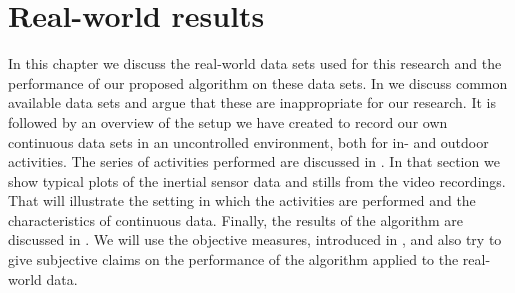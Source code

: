 
\chapter{Real-world results}

\label{Chapter6} %


In this chapter we discuss the real-world data sets used for this research and the performance of our proposed algorithm on these data sets.
In  we discuss common available data sets and argue that these are inappropriate for our research.
It is followed by an overview of the setup we have created to record our own continuous data sets in an uncontrolled environment, both for in- and outdoor activities.
The series of activities performed are discussed in .
In that section we show typical plots of the inertial sensor data and stills from the video recordings.
That will illustrate the setting in which the activities are performed and the characteristics of continuous data.
Finally, the results of the algorithm are discussed in .
We will use the objective measures, introduced in , and also try to give subjective claims on the performance of the algorithm applied to the real-world data.



